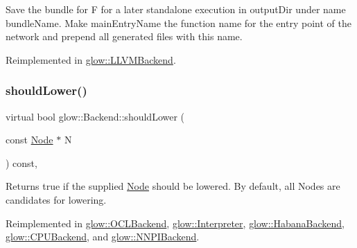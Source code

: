 Save the bundle for {\ttfamily F} for a later standalone execution in {\ttfamily output\+Dir} under name {\ttfamily bundle\+Name}. Make {\ttfamily main\+Entry\+Name} the function name for the entry point of the network and prepend all generated files with this name. 

Reimplemented in \hyperlink{classglow_1_1_l_l_v_m_backend_a94aaf63b75e4e711c72aebb4a3c6c173}{glow\+::\+L\+L\+V\+M\+Backend}.

\mbox{\label{classglow_1_1_backend_aba5bec08f5e60626bcc5238f410d632a}} 
\subsubsection{\texorpdfstring{should\+Lower()}{shouldLower()}}
{\footnotesize\ttfamily virtual bool glow\+::\+Backend\+::should\+Lower (\begin{DoxyParamCaption}\item[{const \hyperlink{classglow_1_1_node}{Node} $\ast$}]{N }\end{DoxyParamCaption}) const\hspace{0.3cm}{\ttfamily [inline]}, {\ttfamily [virtual]}}

\begin{DoxyReturn}{Returns}
true if the supplied \hyperlink{classglow_1_1_node}{Node}  should be lowered. By default, all Nodes are candidates for lowering. 
\end{DoxyReturn}


Reimplemented in \hyperlink{classglow_1_1_o_c_l_backend_afadf9ab6b9686d5227ed285cfd3b8db1}{glow\+::\+O\+C\+L\+Backend}, \hyperlink{classglow_1_1_interpreter_a4af3e91f6b07d5f896b8db8b4e4d2df4}{glow\+::\+Interpreter}, \hyperlink{classglow_1_1_habana_backend_afb3363f26ef92e21fb1d431a1c8699df}{glow\+::\+Habana\+Backend}, \hyperlink{classglow_1_1_c_p_u_backend_a09c56b421ac28d8cdf2c2a332b1caf77}{glow\+::\+C\+P\+U\+Backend}, and \hyperlink{classglow_1_1_n_n_p_i_backend_a3e44cab4bf6fa70d239abb2c70a1a465}{glow\+::\+N\+N\+P\+I\+Backend}.

\mbox{\label{classglow_1_1_backend_a5314d00d2739dca36279cd70b4a01145}} 
